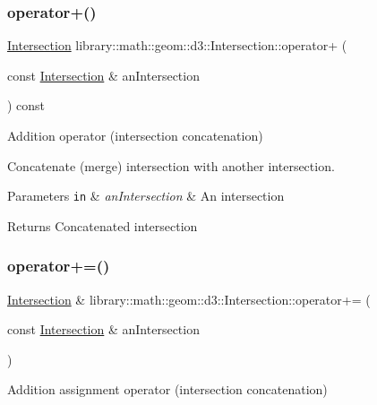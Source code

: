 \subsubsection{\texorpdfstring{operator+()}{operator+()}}
{\footnotesize\ttfamily \hyperlink{classlibrary_1_1math_1_1geom_1_1d3_1_1_intersection}{Intersection} library\+::math\+::geom\+::d3\+::\+Intersection\+::operator+ (\begin{DoxyParamCaption}\item[{const \hyperlink{classlibrary_1_1math_1_1geom_1_1d3_1_1_intersection}{Intersection} \&}]{an\+Intersection }\end{DoxyParamCaption}) const}



Addition operator (intersection concatenation) 

Concatenate (merge) intersection with another intersection.


\begin{DoxyParams}[1]{Parameters}
\mbox{\tt in}  & {\em an\+Intersection} & An intersection \\
\hline
\end{DoxyParams}
\begin{DoxyReturn}{Returns}
Concatenated intersection 
\end{DoxyReturn}
\mbox{\label{classlibrary_1_1math_1_1geom_1_1d3_1_1_intersection_a849f98c4b51f792a93c64fc6dedbce50}} 
\subsubsection{\texorpdfstring{operator+=()}{operator+=()}}
{\footnotesize\ttfamily \hyperlink{classlibrary_1_1math_1_1geom_1_1d3_1_1_intersection}{Intersection} \& library\+::math\+::geom\+::d3\+::\+Intersection\+::operator+= (\begin{DoxyParamCaption}\item[{const \hyperlink{classlibrary_1_1math_1_1geom_1_1d3_1_1_intersection}{Intersection} \&}]{an\+Intersection }\end{DoxyParamCaption})}



Addition assignment operator (intersection concatenation) 

